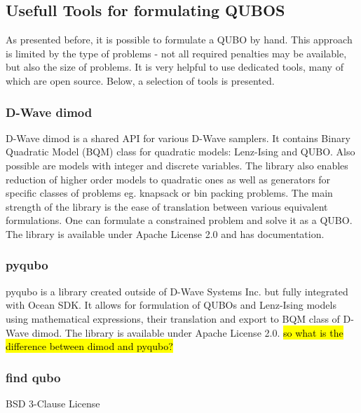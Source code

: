 \subsection{Usefull Tools for formulating QUBOS}\label{sub:qubo_tools}
As presented before, it is possible to formulate a QUBO by hand. This approach is limited by the type of problems - not all required penalties may be available, but also the size of problems. It is very helpful to use dedicated tools, many of which are open source. Below, a selection of tools is presented.
\subsubsection{D-Wave dimod}
D-Wave dimod is a shared API for various D-Wave samplers. It contains Binary Quadratic Model (BQM) class for quadratic models: Lenz-Ising and QUBO. Also possible are models with integer and discrete variables.  The library also enables reduction of higher order models to quadratic ones as well as generators for specific classes of problems eg. knapsack or bin packing problems. The main strength of the library is the ease of translation between various equivalent formulations. One can formulate a constrained problem and solve it as a QUBO. The library is available under Apache License 2.0 and has documentation\cite{noauthor_dimod_2021}.
\subsubsection{pyqubo}
pyqubo is a library created outside of D-Wave Systems Inc. but fully integrated with Ocean SDK. It allows for formulation of QUBOs and Lenz-Ising models using mathematical expressions, their translation and export to BQM class of D-Wave dimod. The library is available under Apache License 2.0\cite{tanahashi_application_2019}\cite{zaman_pyqubo_2021}.
\hl{so what is the difference between dimod and pyqubo?}
\subsubsection{find qubo}
BSD 3-Clause License